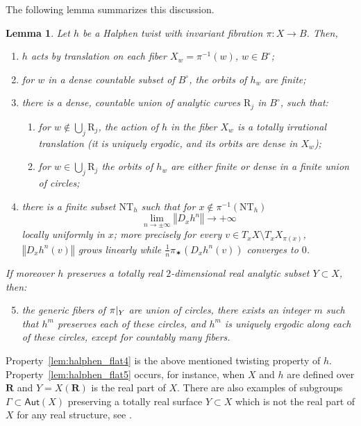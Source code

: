 \documentclass[JEP,XML,SOM,Unicode,published]{cedram}
\newcommand{\norm}[1]{{\left\Vert#1\right\Vert}}
\newcommand{\rest}[1]{ \arrowvert_{#1}}
\newcommand{\lrpar}[1]{\left(#1\right)}
\newcommand{\inv}{^{-1}}
\def\R{\mathbf{R}}
\newcommand\Aut{\mathsf{Aut}}
\theoremstyle{plain}
\newtheorem{lem}[thm]{Lemma}
\theoremstyle{definition}
\begin{document}
The following lemma summarizes this discussion.

\begin{lem}\label{lem:halphen_flat} Let $h$ be a Halphen twist with invariant fibration
$\pi:X\to B$. Then,
\begin{enumerate}
\item\label{lem:halphen_flat1} $h$ acts by translation on each fiber $X_w=\pi^{-1}(w)$, $w \in B^\circ$;
\item\label{lem:halphen_flat2} for $w$ in a dense countable subset of $B^\circ$, the orbits of $h_w$ are finite;
\item\label{lem:halphen_flat3} there is a dense, countable union of analytic curves $\mathrm R_j$ in $B^\circ$,
such that:
\begin{enumerate}
\item\label{lem:halphen_flat3a} for $w\notin\bigcup_j \mathrm R_j$, the action of $h$ in the fiber $X_w$ is a totally irrational
translation (it is uniquely ergodic, and its orbits are dense in $X_w$);
\item\label{lem:halphen_flat3b} for $w\in \bigcup_j \mathrm R_j$ the orbits of $h_w$ are either finite or dense in a finite union of circles;
\end{enumerate}
\item\label{lem:halphen_flat4} there is a finite subset $\mathrm{NT}_h$ such that for $x\notin \pi\inv\lrpar{
\mathrm{NT}_h}$
\[
\lim_{n\to \pm \infty} \norm{D_xh^n}\to +\infty
\]
locally uniformly in $x$; more precisely for every
$v\in T_xX \setminus T_x X_{\pi(x)}$, $\norm{D_x h^{n}(v)}$ grows linearly while
$\frac{1}{n}\pi_\varstar (D_xh^{n}(v))$ converges to $0$.
\end{enumerate}
If moreover $h$ preserves a totally real $2$-dimensional real analytic subset $Y\subset X$, then:
\begin{enumerate}\setcounter{enumi}{4}
\item\label{lem:halphen_flat5} the generic fibers of $\pi\rest{Y}$ are union of circles,
there exists an integer $m$ such that $h^m$ preserves each of these circles, and $h^m$ is uniquely ergodic along each of these circles,
except for countably many fibers.
\end{enumerate}
\end{lem}

Property~\eqref{lem:halphen_flat4} is the above mentioned twisting property of $h$. Property~\eqref{lem:halphen_flat5} occurs, for instance, when $X$ and $h$ are defined over $\R$
and $Y=X(\R)$ is the real part of $X$. There are also examples of
subgroups $\Gamma\subset \Aut(X)$ preserving a totally real surface $Y\subset X$ which is not the real part of $X$ for any real structure, see \cite[\S 9]{invariant}.
\end{document}
